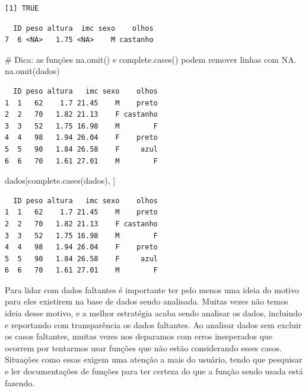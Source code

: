 \documentclass[
  letterpaper,
  DIV=11,
  numbers=noendperiod]{scrreprt}
\newenvironment{Shaded}{\begin{snugshade}}{\end{snugshade}}
\newcommand{\CommentTok}[1]{\textcolor[rgb]{0.37,0.37,0.37}{#1}}
\newcommand{\FunctionTok}[1]{\textcolor[rgb]{0.28,0.35,0.67}{#1}}
\newcommand{\NormalTok}[1]{\textcolor[rgb]{0.00,0.23,0.31}{#1}}
\newcommand{\SpecialCharTok}[1]{\textcolor[rgb]{0.37,0.37,0.37}{#1}}
\begin{document}
\begin{verbatim}
[1] TRUE
\end{verbatim}

\begin{Shaded}
\end{Shaded}

\begin{verbatim}
  ID peso altura  imc sexo    olhos
7  6 <NA>   1.75 <NA>    M castanho
\end{verbatim}

\begin{Shaded}
\begin{Highlighting}[]
\CommentTok{\# Dica: as funções na.omit() e complete.cases() podem remover linhas com NA.}
\FunctionTok{na.omit}\NormalTok{(dados)}
\end{Highlighting}
\end{Shaded}

\begin{verbatim}
  ID peso altura   imc sexo    olhos
1  1   62    1.7 21.45    M    preto
2  2   70   1.82 21.13    F castanho
3  3   52   1.75 16.98    M        F
4  4   98   1.94 26.04    F    preto
5  5   90   1.84 26.58    F     azul
6  6   70   1.61 27.01    M        F
\end{verbatim}

\begin{Shaded}
\begin{Highlighting}[]
\NormalTok{dados[}\FunctionTok{complete.cases}\NormalTok{(dados), ]}
\end{Highlighting}
\end{Shaded}

\begin{verbatim}
  ID peso altura   imc sexo    olhos
1  1   62    1.7 21.45    M    preto
2  2   70   1.82 21.13    F castanho
3  3   52   1.75 16.98    M        F
4  4   98   1.94 26.04    F    preto
5  5   90   1.84 26.58    F     azul
6  6   70   1.61 27.01    M        F
\end{verbatim}

Para lidar com dados faltantes é importante ter pelo menos uma ideia do
motivo para eles existirem na base de dados sendo analisada. Muitas
vezes não temos ideia desse motivo, e a melhor estratégia acaba sendo
analisar os dados, incluindo e reportando com transparência os dados
faltantes. Ao analisar dados sem excluir os casos faltantes, muitas
vezes nos deparamos com erros inesperados que ocorrem por tentarmos usar
funções que não estão considerando esses casos. Situações como essas
exigem uma atenção a mais do usuário, tendo que pesquisar e ler
documentações de funções para ter certeza do que a função sendo usada
está fazendo.
\end{document}
